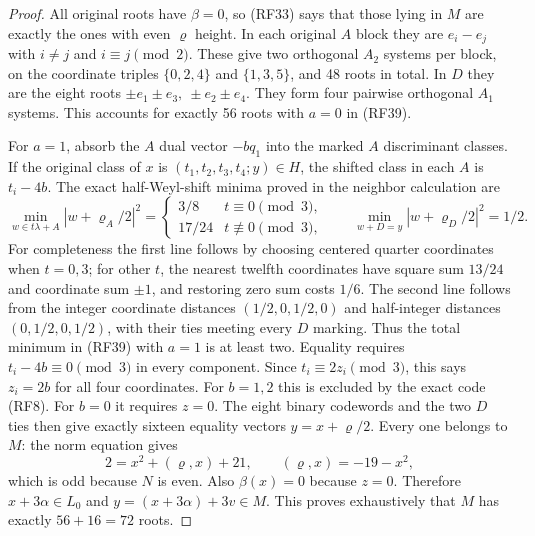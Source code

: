 \begin{proof}
All original roots have $\beta=0$, so (RF33) says that those
lying in $M$ are exactly the ones with even $\varrho$ height.
In each original $A$ block they are
$e_i-e_j$ with $i\ne j$ and $i\equiv j\pmod2$.
These give two orthogonal $A_2$ systems per block, on the
coordinate triples $\{0,2,4\}$ and $\{1,3,5\}$, and 48 roots
in total. In $D$ they are the eight roots
$\pm e_1\pm e_3,\ \pm e_2\pm e_4$.
They form four pairwise orthogonal $A_1$ systems.
This accounts for exactly 56 roots with $a=0$ in (RF39).

For $a=1$, absorb the $A$ dual vector $-bq_1$ into the
marked $A$ discriminant classes.
If the original class of $x$ is $(t_1,t_2,t_3,t_4;y)\in H$,
the shifted class in each $A$ is $t_i-4b$.
The exact half-Weyl-shift minima proved in the neighbor
calculation are
\[
 \min_{w\in t\lambda+A}|w+\varrho_A/2|^2
 =\begin{cases}3/8& t\equiv0\pmod3,\\17/24&t\not\equiv0\pmod3,\end{cases}
 \qquad
 \min_{w+D=y}|w+\varrho_D/2|^2=1/2.
 \tag{RF41}
\]
For completeness the first line follows by choosing centered
quarter coordinates when $t=0,3$; for other $t$, the nearest
twelfth coordinates have square sum $13/24$ and coordinate
sum $\pm1$, and restoring zero sum costs $1/6$.
The second line follows from the integer coordinate distances
$(1/2,0,1/2,0)$ and half-integer distances
$(0,1/2,0,1/2)$, with their ties meeting every $D$ marking.
Thus the total minimum in (RF39) with $a=1$ is at least two.
Equality requires $t_i-4b\equiv0\pmod3$ in every component.
Since $t_i\equiv2z_i\pmod3$, this says
$z_i=2b$ for all four coordinates.
For $b=1,2$ this is excluded by the exact code (RF8).
For $b=0$ it requires $z=0$.
The eight binary codewords and the two $D$ ties then give
exactly sixteen equality vectors $y=x+\varrho/2$.
Every one belongs to $M$: the norm equation gives
\[
 2=x^2+(\varrho,x)+21,\qquad
                         (\varrho,x)=-19-x^2,
 \tag{RF42}
\]
which is odd because $N$ is even.
Also $\beta(x)=0$ because $z=0$.
Therefore $x+3\alpha\in L_0$ and
$y=(x+3\alpha)+3v\in M$.
This proves exhaustively that $M$ has exactly $56+16=72$ roots.


\end{proof}
